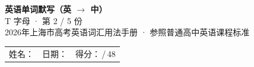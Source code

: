 \documentclass[10pt,a4paper]{article}
\begin{document}
\pagestyle{plain}

\begin{center}
{\LARGE\bfseries 英语单词默写（英 $\to$ 中）}\\[0.22em]
{\large T 字母 · 第 2 / 5 份}\\[0.18em]
{\small 2026年上海市高考英语词汇用法手册 · 参照普通高中英语课程标准}
\end{center}

\vspace{0.25em}
\noindent\begin{tabular}{@{}p{}@{}p{}@{}p{}@{}}
姓名：\underline{\hspace{2.0cm}} & 日期：\underline{\hspace{2.0cm}} & 得分：\underline{\hspace{1.3cm}}\,/\,48 \\
\end{tabular}

\vspace{0.3em}

\vspace{0.08em}
\end{document}
